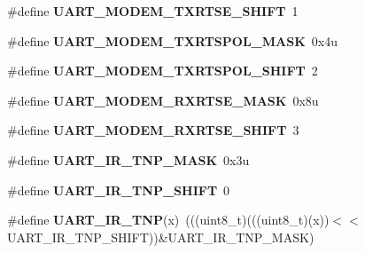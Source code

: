 \begin{DoxyCompactItemize}
\item 
\#define {\bfseries U\+A\+R\+T\+\_\+\+M\+O\+D\+E\+M\+\_\+\+T\+X\+R\+T\+S\+E\+\_\+\+S\+H\+I\+FT}~1\hypertarget{group__UART__Register__Masks_gadc29d3e7148a1f7a895a1db6442cc5b8}{}\label{group__UART__Register__Masks_gadc29d3e7148a1f7a895a1db6442cc5b8}

\item 
\#define {\bfseries U\+A\+R\+T\+\_\+\+M\+O\+D\+E\+M\+\_\+\+T\+X\+R\+T\+S\+P\+O\+L\+\_\+\+M\+A\+SK}~0x4u\hypertarget{group__UART__Register__Masks_ga83617aa9166494f2dbed5da69b5ae0ef}{}\label{group__UART__Register__Masks_ga83617aa9166494f2dbed5da69b5ae0ef}

\item 
\#define {\bfseries U\+A\+R\+T\+\_\+\+M\+O\+D\+E\+M\+\_\+\+T\+X\+R\+T\+S\+P\+O\+L\+\_\+\+S\+H\+I\+FT}~2\hypertarget{group__UART__Register__Masks_ga3b069f2bfe05099b3fdb47e872c6b2e6}{}\label{group__UART__Register__Masks_ga3b069f2bfe05099b3fdb47e872c6b2e6}

\item 
\#define {\bfseries U\+A\+R\+T\+\_\+\+M\+O\+D\+E\+M\+\_\+\+R\+X\+R\+T\+S\+E\+\_\+\+M\+A\+SK}~0x8u\hypertarget{group__UART__Register__Masks_gaceb719e6bb4624e1b8a5a922bd594778}{}\label{group__UART__Register__Masks_gaceb719e6bb4624e1b8a5a922bd594778}

\item 
\#define {\bfseries U\+A\+R\+T\+\_\+\+M\+O\+D\+E\+M\+\_\+\+R\+X\+R\+T\+S\+E\+\_\+\+S\+H\+I\+FT}~3\hypertarget{group__UART__Register__Masks_gabbe55b53dd5c048084d8c9341e522d90}{}\label{group__UART__Register__Masks_gabbe55b53dd5c048084d8c9341e522d90}

\item 
\#define {\bfseries U\+A\+R\+T\+\_\+\+I\+R\+\_\+\+T\+N\+P\+\_\+\+M\+A\+SK}~0x3u\hypertarget{group__UART__Register__Masks_ga635e77629e602b47032f8d35dda0f442}{}\label{group__UART__Register__Masks_ga635e77629e602b47032f8d35dda0f442}

\item 
\#define {\bfseries U\+A\+R\+T\+\_\+\+I\+R\+\_\+\+T\+N\+P\+\_\+\+S\+H\+I\+FT}~0\hypertarget{group__UART__Register__Masks_gafc08f087483347c37c3051f6c86d2beb}{}\label{group__UART__Register__Masks_gafc08f087483347c37c3051f6c86d2beb}

\item 
\#define {\bfseries U\+A\+R\+T\+\_\+\+I\+R\+\_\+\+T\+NP}(x)~(((uint8\+\_\+t)(((uint8\+\_\+t)(x))$<$$<$U\+A\+R\+T\+\_\+\+I\+R\+\_\+\+T\+N\+P\+\_\+\+S\+H\+I\+FT))\&U\+A\+R\+T\+\_\+\+I\+R\+\_\+\+T\+N\+P\+\_\+\+M\+A\+SK)\hypertarget{group__UART__Register__Masks_ga5c51f9fcc539b3d1c55ede0ca356e506}{}\label{group__UART__Register__Masks_ga5c51f9fcc539b3d1c55ede0ca356e506}


\end{DoxyCompactItemize}
